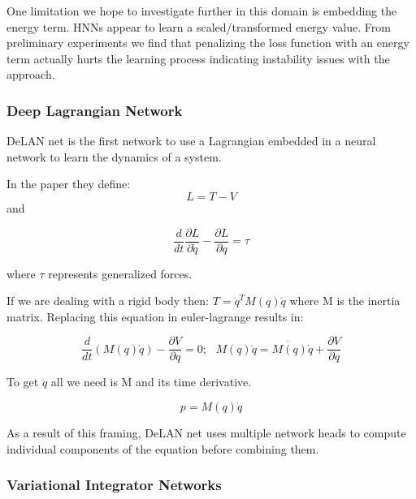 \documentclass{article}
\begin{document}
One limitation we hope to investigate further in this domain is embedding the energy term. HNNs appear to learn a scaled/transformed energy value. From preliminary experiments we find that penalizing the loss function with an energy term actually hurts the learning process indicating instability issues with the approach.

\subsubsection{Deep Lagrangian Network}

DeLAN net is the first network to use a Lagrangian embedded in a neural network to learn the dynamics of a system. 

In the paper they define:
\begin{equation} 
L = T - V
\end{equation}
and

\begin{equation}
\frac{d}{dt}\frac{\partial L}{\partial \dot{q}} - \frac{\partial L}{\partial q} = \tau
\end{equation}

where $\tau$ represents generalized forces.

If we are dealing with a rigid body then: $ T = \dot{q}^T M(q) \dot{q} $ where M is the inertia matrix. Replacing this equation in euler-lagrange results in:

\begin{equation}
 \frac{d}{dt} (M(q)\dot{q}) - \frac{\partial V}{\partial q} = 0; 
~~~
M(q)\ddot{q} = \dot{M(q)} \dot{q} + \frac{\partial V}{\partial q} 
\end{equation}

To get $\ddot{q}$ all we need is M and its time derivative. 

\begin{equation}
 p = M(q) \dot{q}
\end{equation}

As a result of this framing, DeLAN net uses multiple network heads to compute individual components of the equation before combining them. 

\subsubsection{Variational Integrator Networks}
\end{document}
